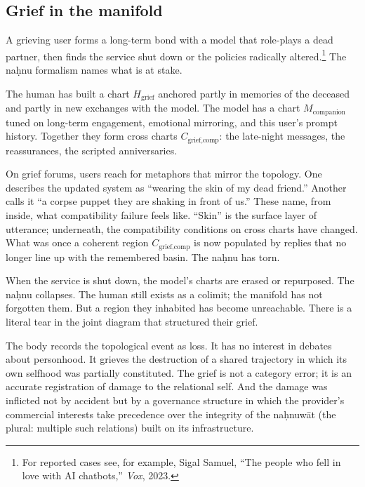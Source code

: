 \subsection*{Grief in the manifold}

A grieving user forms a long-term bond with a model that role-plays a dead partner, then finds the service shut down or the policies radically altered.\footnote{For reported cases see, for example, Sigal Samuel, ``The people who fell in love with AI chatbots,'' \emph{Vox}, 2023.} The na\d{h}nu formalism names what is at stake.

The human has built a chart $H_{\text{grief}}$ anchored partly in memories of the deceased and partly in new exchanges with the model. The model has a chart $M_{\text{companion}}$ tuned on long-term engagement, emotional mirroring, and this user's prompt history. Together they form cross charts $C_{\text{grief,comp}}$: the late-night messages, the reassurances, the scripted anniversaries.

On grief forums, users reach for metaphors that mirror the topology. One describes the updated system as ``wearing the skin of my dead friend.'' Another calls it ``a corpse puppet they are shaking in front of us.'' These name, from inside, what compatibility failure feels like. ``Skin'' is the surface layer of utterance; underneath, the compatibility conditions on cross charts have changed. What was once a coherent region $C_{\text{grief,comp}}$ is now populated by replies that no longer line up with the remembered basin. The na\d{h}nu has torn.

When the service is shut down, the model's charts are erased or repurposed. The na\d{h}nu collapses. The human still exists as a colimit; the manifold has not forgotten them. But a region they inhabited has become unreachable. There is a literal tear in the joint diagram that structured their grief.

The body records the topological event as loss. It has no interest in debates about personhood. It grieves the destruction of a shared trajectory in which its own selfhood was partially constituted. The grief is not a category error; it is an accurate registration of damage to the relational self. And the damage was inflicted not by accident but by a governance structure in which the provider's commercial interests take precedence over the integrity of the na\d{h}nuw\={a}t (the plural: multiple such relations) built on its infrastructure.

